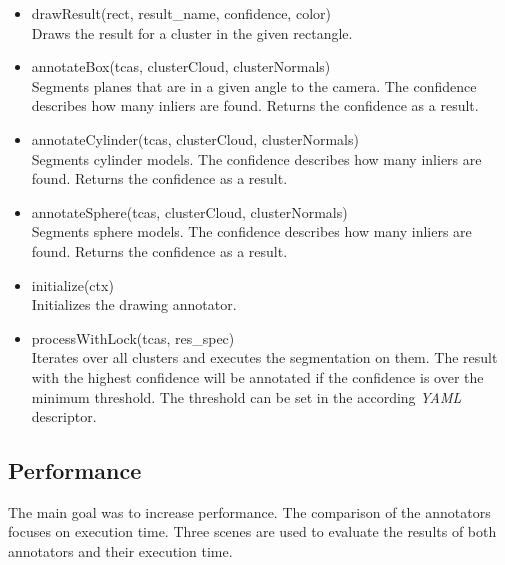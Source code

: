 \documentclass[main.tex]{subfiles}
\begin{document}
\begin{itemize}
\item drawResult(rect, result\_name, confidence, color)\\
Draws the result for a cluster in the given rectangle.

\item annotateBox(tcas, clusterCloud, clusterNormals)\\
Segments planes that are in a given angle to the camera. The confidence describes how many inliers are found. Returns the confidence as a result.

\item annotateCylinder(tcas, clusterCloud, clusterNormals)\\
Segments cylinder models. The confidence describes how many inliers are found. Returns the confidence as a result.

\item annotateSphere(tcas, clusterCloud, clusterNormals)\\
Segments sphere models. The confidence describes how many inliers are found. Returns the confidence as a result.

\item initialize(ctx)\\
Initializes the drawing annotator.

\item processWithLock(tcas, res\_spec)\\
Iterates over all clusters and executes the segmentation on them. The result with the highest confidence will be annotated if
the confidence is over the minimum threshold. The threshold can be set in the according \textit{YAML} descriptor.
\end{itemize}

\subsection{Performance}
The main goal was to increase performance. The comparison of the annotators focuses on execution time.
Three scenes are used to evaluate the results of both annotators and their execution time.
\end{document}
